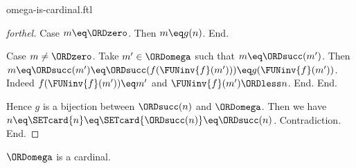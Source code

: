 \documentclass{naproche-library}
\begin{document}
\begin{smodule}[title=$\omega$ is a Cardinal Number]{omega-is-cardinal.ftl}
\begin{proof}[forthel]
      Case $m \eq \ORDzero$.
        Then $m \eq g(n)$.
      End.

      Case $m \neq \ORDzero$.
        Take $m' \in \ORDomega$ such that $m \eq \ORDsucc(m')$.
        Then $m
          \eq \ORDsucc(m')
          \eq \ORDsucc(f(\FUNinv{f}(m')))
          \eq g(\FUNinv{f}(m'))$.
        Indeed $f(\FUNinv{f}(m')) \eq m'$ and $\FUNinv{f}(m') \ORDless n$.
      End.
    End.

    Hence $g$ is a bijection between $\ORDsucc(n)$ and $\ORDomega$.
    Then we have $n
      \eq \SETcard{n}
      \eq \SETcard{\ORDsucc(n)}
      \eq \ORDsucc(n)$.
    Contradiction.
  End.
\end{proof}

\begin{corollary}[forthel,id=SET_THEORY_07_2717623053713408]
  $\ORDomega$ is a cardinal.
\end{corollary}
\end{smodule}
\end{document}
